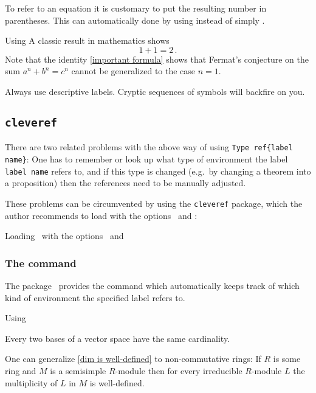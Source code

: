 To refer to an equation it is customary to put the resulting number in parentheses.
This can automatically done by using  instead of simply .
\begin{showlatex}{Using }
A classic result in mathematics shows
\begin{equation}
  \label{important formula}
  1 + 1 = 2 \,.
\end{equation}
Note that the identity \eqref{important formula} shows that Fermat’s conjecture on the sum $a^n + b^n = c^n$ cannot be generalized to the case $n = 1$.
\end{showlatex}

Always use descriptive labels.
Cryptic sequences of symbols will backfire on you.



\subsection{\texttt{cleveref}}

There are two related problems with the above way of using \texttt{Type~{\tbs}ref\{label name\}}:
One has to remember or look up what type of environment the label \texttt{label name} refers to, and if this type is changed (e.g.\ by changing a theorem into a proposition) then the references need to be manually adjusted.

These problems can be circumvented by using the \texttt{cleveref} package, which the author recommends to load with the options~ and :
\begin{showcode}[label={cref example}]{Loading~ with the options~ and~}
\usepackage[capitalise, noabbrev]{cleveref}
\end{showcode}

\subsubsection{The command~}

The package~ provides the command  which automatically keeps track of which kind of environment the specified label refers to.
\begin{showlatex}{Using~}
\begin{lemma}
  \label{dim is well-defined}
  Every two bases of a vector space have the same cardinality.
\end{lemma}

\begin{remark}
  One can generalize \cref{dim is well-defined} to non-commutative rings:
  If $R$ is some ring and $M$ is a semisimple $R$-module then for every irreducible $R$-module $L$ the multiplicity of $L$ in $M$ is well-defined.
\end{remark}
\end{showlatex}

